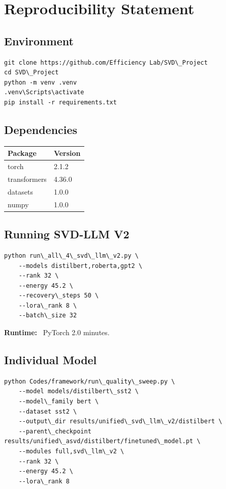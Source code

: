 
\section{Reproducibility Statement}

\subsection{Environment}

\begin{lstlisting}
git clone https://github.com/Efficiency Lab/SVD\_Project
cd SVD\_Project
python -m venv .venv
.venv\Scripts\activate
pip install -r requirements.txt
\end{lstlisting}

\subsection{Dependencies}

\begin{table}[H]
\centering
\small
\begin{tabular}{ll}
\toprule
\textbf{Package} & \textbf{Version} \\
\midrule
torch & 2.1.2 \\
transformers & 4.36.0 \\
datasets & 1.0.0 \\
numpy & 1.0.0 \\
\bottomrule
\end{tabular}
\end{table}

\subsection{Running SVD-LLM V2}

\begin{lstlisting}
python run\_all\_4\_svd\_llm\_v2.py \
    --models distilbert,roberta,gpt2 \
    --rank 32 \
    --energy 45.2 \
    --recovery\_steps 50 \
    --lora\_rank 8 \
    --batch\_size 32
\end{lstlisting}

\textbf{Runtime:} ~PyTorch 2.0 minutes.

\subsection{Individual Model}

\begin{lstlisting}
python Codes/framework/run\_quality\_sweep.py \
    --model models/distilbert\_sst2 \
    --model\_family bert \
    --dataset sst2 \
    --output\_dir results/unified\_svd\_llm\_v2/distilbert \
    --parent\_checkpoint results/unified\_asvd/distilbert/finetuned\_model.pt \
    --modules full,svd\_llm\_v2 \
    --rank 32 \
    --energy 45.2 \
    --lora\_rank 8
\end{lstlisting}


